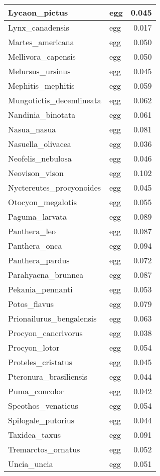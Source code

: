 \begin{table}
\begin{tabular}[t]{l|l|r}
\hline
Lycaon\_pictus & egg & 0.045\\
\hline
Lynx\_canadensis & egg & 0.017\\
\hline
Martes\_americana & egg & 0.050\\
\hline
Mellivora\_capensis & egg & 0.050\\
\hline
Melursus\_ursinus & egg & 0.045\\
\hline
Mephitis\_mephitis & egg & 0.059\\
\hline
Mungotictis\_decemlineata & egg & 0.062\\
\hline
Nandinia\_binotata & egg & 0.061\\
\hline
Nasua\_nasua & egg & 0.081\\
\hline
Nasuella\_olivacea & egg & 0.036\\
\hline
Neofelis\_nebulosa & egg & 0.046\\
\hline
Neovison\_vison & egg & 0.102\\
\hline
Nyctereutes\_procyonoides & egg & 0.045\\
\hline
Otocyon\_megalotis & egg & 0.055\\
\hline
Paguma\_larvata & egg & 0.089\\
\hline
Panthera\_leo & egg & 0.087\\
\hline
Panthera\_onca & egg & 0.094\\
\hline
Panthera\_pardus & egg & 0.072\\
\hline
Parahyaena\_brunnea & egg & 0.087\\
\hline
Pekania\_pennanti & egg & 0.053\\
\hline
Potos\_flavus & egg & 0.079\\
\hline
Prionailurus\_bengalensis & egg & 0.063\\
\hline
Procyon\_cancrivorus & egg & 0.038\\
\hline
Procyon\_lotor & egg & 0.054\\
\hline
Proteles\_cristatus & egg & 0.045\\
\hline
Pteronura\_brasiliensis & egg & 0.044\\
\hline
Puma\_concolor & egg & 0.042\\
\hline
Speothos\_venaticus & egg & 0.054\\
\hline
Spilogale\_putorius & egg & 0.044\\
\hline
Taxidea\_taxus & egg & 0.091\\
\hline
Tremarctos\_ornatus & egg & 0.052\\
\hline
Uncia\_uncia & egg & 0.051\\

\end{tabular}
\end{table}
